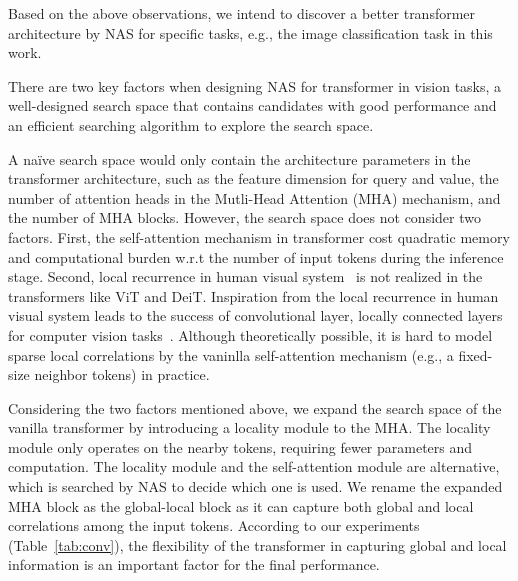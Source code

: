 \documentclass[10pt,twocolumn,letterpaper]{article}
\begin{document}
Based on the above observations, we intend to discover a better transformer architecture by NAS for specific tasks, e.g., the image classification task in this work.

There are two key factors when designing NAS for transformer in vision tasks, a well-designed search space that contains candidates with good performance and an efficient searching algorithm to explore the search space.



A na\"ive search space would only contain the architecture parameters in the transformer architecture, such as the feature dimension for query and value, the number of attention heads in the Mutli-Head Attention (MHA) mechanism, and the number of MHA blocks. However, the search space does not consider two factors. First, the  self-attention mechanism in transformer cost quadratic memory and computational burden w.r.t the number of input tokens \cite{Defor-Detr} during the inference stage. 
Second, local recurrence in human visual system~\cite{kietzmann2019recurrence, humanvision-2016} is not realized in the transformers like ViT and DeiT.
Inspiration from the local recurrence in human visual system leads to the success of convolutional layer, locally connected layers for computer vision tasks~\cite{lecun1995convolutional}. Although theoretically possible, it is hard to model sparse local correlations by the vaninlla self-attention mechanism (e.g., a fixed-size neighbor tokens) in practice.

Considering the two factors mentioned above, we expand the search space of the vanilla transformer by introducing a locality module to the MHA. The locality module only operates on the nearby tokens, requiring fewer parameters and computation. The locality module and the self-attention module are alternative, which is searched by NAS to decide which one is used. We rename the expanded MHA block as the global-local block as it can capture both global and local correlations among the input tokens.
According to our experiments (Table~\ref{tab:conv}), the flexibility of the transformer in capturing global and local information is an important factor for the final performance.
\end{document}
